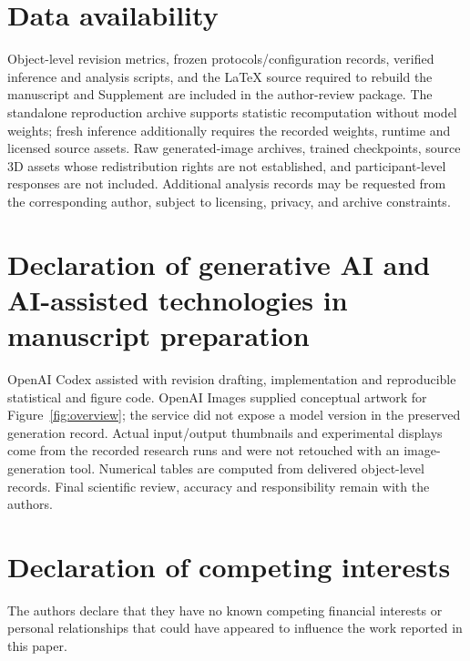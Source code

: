 \documentclass[times,twocolumn,final]{elsarticle}
\begin{document}
\section*{Data availability}

Object-level revision metrics, frozen protocols/configuration records, verified inference and analysis scripts, and the LaTeX source required to rebuild the manuscript and Supplement are included in the author-review package. The standalone reproduction archive supports statistic recomputation without model weights; fresh inference additionally requires the recorded weights, runtime and licensed source assets. Raw generated-image archives, trained checkpoints, source 3D assets whose redistribution rights are not established, and participant-level responses are not included. Additional analysis records may be requested from the corresponding author, subject to licensing, privacy, and archive constraints.

\section*{Declaration of generative AI and AI-assisted technologies in manuscript preparation}
OpenAI Codex assisted with revision drafting, implementation and reproducible statistical and figure code. OpenAI Images supplied conceptual artwork for Figure~\ref{fig:overview}; the service did not expose a model version in the preserved generation record. Actual input/output thumbnails and experimental displays come from the recorded research runs and were not retouched with an image-generation tool. Numerical tables are computed from delivered object-level records. Final scientific review, accuracy and responsibility remain with the authors.

\section*{Declaration of competing interests}

The authors declare that they have no known competing financial interests or personal relationships that could have appeared to influence the work reported in this paper.
\end{document}
